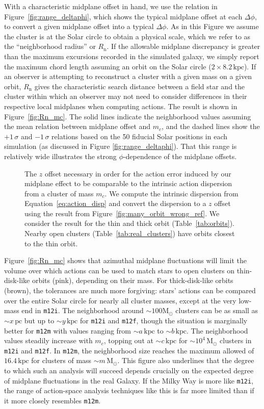 \documentclass[twocolumn]{aastex62}
\newcommand{\Msun}{\ensuremath{\text{M}_\odot}}
\newcommand{\pc}{\text{pc}}
\newcommand{\kpc}{\text{kpc}}
\newcommand{\mi}{\texttt{m12i}}
\newcommand{\mf}{\texttt{m12f}}
\newcommand{\mm}{\texttt{m12m}}
\newcommand{\n}{\text{n}}
\newcommand{\thincolor}{pink}
\newcommand{\thickcolor}{brown}
\begin{document}
With a characteristic midplane offset in hand, we use the relation in
Figure~\ref{fig:range_deltaphi}, which shows the typical midplane offset at
each $\Delta \phi$, to convert a given midplane offset into a typical
$\Delta\phi$. As in this Figure we assume the cluster is at the Solar circle
to obtain a physical scale, which we refer to as the ``neighborhood radius''
or $R_{\n}$. If the allowable midplane discrepancy is greater than the maximum
excursions recorded in the simulated galaxy, we simply report the maximum
chord length assuming an orbit on the Solar circle ($2\times8.2\,\kpc$). If an
observer is attempting to reconstruct a cluster with a given mass on a given
orbit, $R_{\n}$ gives the characteristic search distance between a field star
and the cluster within which an observer may not need to consider differences
in their respective local midplanes when computing actions. The result is
shown in Figure~\ref{fig:Rn_mc}. The solid lines indicate the neighborhood
values assuming the mean relation between midplane offset and $m_c$, and the
dashed lines show the $+1\,\sigma$ and $-1\,\sigma$ relations based on the 50
fiducial Solar positions in each simulation (as discussed in Figure
\ref{fig:range_deltaphi}). That this range is relatively wide illustrates the
strong $\phi$-dependence of the midplane offsets.

\begin{figure}
\caption{The $z$ offset necessary in order for the action error induced by our
midplane effect to be comparable to the intrinsic action dispersion from a
cluster of mass $m_c$. We compute the intrinsic dispersion from
Equation~\ref{eq:action_disp} and convert the dispersion to a $z$ offset using
the result from Figure~\ref{fig:many_orbit_wrong_ref}. We consider the result
for the thin and thick orbit (Table~\ref{tab:orbits}). Nearby open clusters
(Table~\ref{tab:real_clusters}) have orbits closest to the thin orbit.}
\label{fig:cluster_offset}
\end{figure}

Figure~\ref{fig:Rn_mc} shows that azimuthal midplane fluctuations will limit
the volume over which actions can be used to match stars to open clusters on
thin-disk-like orbits (\thincolor), depending on their mass. For
thick-disk-like orbits (\thickcolor), the tolerances are much more forgiving:
stars' actions can be compared over the entire Solar circle for nearly all
cluster masses, except at the very low-mass end in \mi . The neighborhood
around $\sim100\Msun$ clusters can be as small as $\sim x\,\pc$ but up to
$\sim y\,\kpc$ for \mi{} and \mf{}, though the situation is marginally better
for \mm{} with values ranging from $\sim a\,\kpc$ to $\sim b\,\kpc$. The
neighborhood values steadily increase with $m_c$, topping out at $\sim c\,\kpc$
for $\sim10^4\,\Msun$ clusters in
\mi{} and \mf{}. In \mm{}, the neighborhood size reaches the maximum allowed of
$16.4\,\kpc$ for clusters of mass $\sim m\,\Msun$. This figure also
underlines that the degree to which such an analysis will succeed depends
crucially on the expected degree of midplane fluctuations in the real Galaxy.
If the Milky Way is more like \mi , the range of action-space analysis
techniques like this is far more limited than if it more closely resembles
\mm{}.
\end{document}
